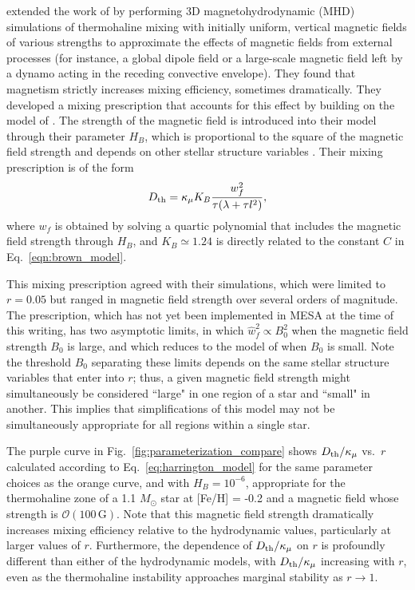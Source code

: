 \citet{harrington} extended the work of \citet{brown_etal_2013} by performing 3D magnetohydrodynamic (MHD) simulations of thermohaline mixing with initially uniform, vertical magnetic fields of various strengths to approximate the effects of magnetic fields from external processes (for instance, a global dipole field or a large-scale magnetic field left by a dynamo acting in the receding convective envelope). 
They found that magnetism strictly increases mixing efficiency, sometimes dramatically.
They developed a mixing prescription that accounts for this effect by building on the model of \citet{brown_etal_2013}.
The strength of the magnetic field is introduced into their model through their parameter $H_B$, which is proportional to the square of the magnetic field strength and depends on other stellar structure variables \citep[see Eq.~19 of][]{harrington}.
Their mixing prescription is of the form
\begin{equation} \label{eq:harrington_model}
    \Dth = \kappa_{\mu}K_B\frac{w_f^2}{\tau (\lambda + \tau l^2)},
\end{equation}
where $w_f$ is obtained by solving a quartic polynomial that includes the magnetic field strength through $H_B$, and $K_B \simeq 1.24$ is directly related to the constant $C$ in Eq.~\eqref{eqn:brown_model}.

This mixing prescription agreed with their simulations, which were limited to $r = 0.05$ but ranged in magnetic field strength over several orders of magnitude.
The prescription, which has not yet been implemented in MESA at the time of this writing, has two asymptotic limits, in which $\hat{w}_f^2 \propto B_0^2$ when the magnetic field strength $B_0$ is large, and which reduces to the model of \citet{brown_etal_2013} when $B_0$ is small. 
Note the threshold $B_0$ separating these limits depends on the same stellar structure variables that enter into $r$; thus, a given magnetic field strength might simultaneously be considered ``large" in one region of a star and ``small" in another. 
This implies that simplifications of this model may not be simultaneously appropriate for all regions within a single star.

The purple curve in Fig.~\ref{fig:parameterization_compare} shows $D_\mathrm{th}/\kappa_\mu$ vs.~$r$ calculated according to Eq.~\eqref{eq:harrington_model} for the same parameter choices as the orange curve, and with $H_B = 10^{-6}$, appropriate for the thermohaline zone of a 1.1 $M_\odot$ star at [Fe/H] = -0.2 and a magnetic field whose strength is $\mathcal{O}(100 \,\mathrm{G})$. 
Note that this magnetic field strength dramatically increases mixing efficiency relative to the hydrodynamic values, particularly at larger values of $r$. 
Furthermore, the dependence of $D_\mathrm{th}/\kappa_\mu$ on $r$ is profoundly different than either of the hydrodynamic models, with $D_\mathrm{th}/\kappa_\mu$ increasing with $r$, even as the thermohaline instability approaches marginal stability as $r \to 1$.

